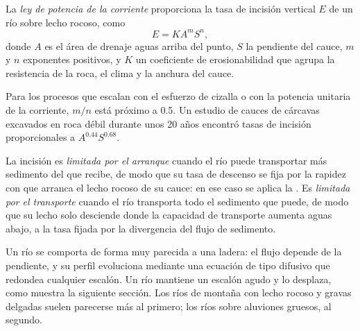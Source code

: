 \begin{definition}\label{def:b3:quantitative-geomorphology:stream-power}
La \emph{ley de potencia de la corriente} proporciona la tasa
de incisión vertical $E$ de un río sobre lecho rocoso, como
\[
E = K A^m S^n ,
\]
donde $A$ es el área de drenaje aguas arriba del punto, $S$ la pendiente del cauce, $m$ y $n$
exponentes positivos, y $K$ un coeficiente de erosionabilidad que agrupa la resistencia de la roca,
el clima y la anchura del cauce.
\end{definition}

Para los procesos que escalan con el esfuerzo de cizalla o con la potencia unitaria de la corriente,
$m/n$ está próximo a 0.5. Un estudio de cauces de cárcavas excavados en roca débil durante
unos 20 años encontró tasas de incisión proporcionales a $A^{0.44}S^{0.68}$.

\begin{definition}\label{def:b3:quantitative-geomorphology:limited}
La incisión es \emph{limitada por el arranque} cuando el río puede
transportar más sedimento del que recibe, de modo que su tasa de descenso se fija por la rapidez
con que arranca el lecho rocoso de su cauce: en ese caso se aplica la
. Es
\emph{limitada por el transporte} cuando el río
transporta todo el sedimento que puede, de modo que su lecho solo desciende donde la capacidad
de transporte aumenta aguas abajo, a la tasa fijada por la divergencia
del flujo de sedimento.
\end{definition}

Un río  se comporta de forma muy parecida a una ladera: el flujo
depende de la pendiente, y su perfil evoluciona mediante una ecuación de tipo difusivo que
redondea cualquier escalón. Un río  mantiene un escalón agudo y lo
desplaza, como muestra la siguiente sección. Los ríos de montaña con lecho rocoso y gravas
delgadas suelen parecerse más al primero; los ríos sobre aluviones gruesos, al
segundo.

